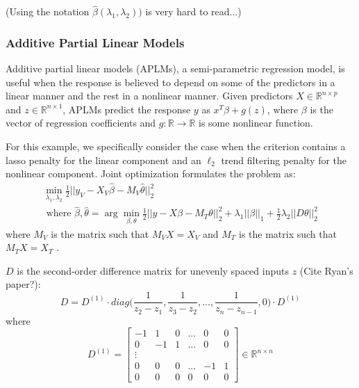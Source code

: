 \documentclass[10pt,letterpaper]{article}
\begin{document}
(Using the notation $\hat \beta(\lambda_1, \lambda_2))$ is very hard to read...)

\subsubsection{Additive Partial Linear Models}

Additive partial linear models (APLMs), a semi-parametric regression model, is useful when the response is believed to depend on some of the predictors in a linear manner and the rest in a nonlinear manner. Given predictors $X \in \mathbb{R}^{n \times p}$ and $z \in \mathbb{R}^{n \times 1}$, APLMs predict the response $y$ as $x^T\beta + g(z)$, where $\beta$ is the vector of regression coefficients and $g: \mathbb{R} \rightarrow \mathbb{R} $ is some nonlinear function.

For this example, we specifically consider the case when the criterion contains a lasso penalty for the linear component and an $\ell_2$ trend filtering penalty for the nonlinear component. Joint optimization formulates the problem as:
\begin{equation}
\begin{array}{c}
\min_{\lambda_1, \lambda_2} \frac{1}{2} \bigl\lvert\bigl\lvert y_V - X_V\hat\beta - M_V \hat\theta \bigl\rvert\bigl\rvert^2_2 \\
\text{ where } \hat\beta, \hat\theta = \arg\min_{\beta, \theta} \frac{1}{2} \bigl\lvert\bigl\lvert y - X\beta - M_T \theta \bigl\rvert\bigl\rvert^2_2
+ \lambda_1 \lvert\lvert \beta \rvert \rvert_1
+ \frac{1}{2} \lambda_2 \lvert\lvert D \theta \rvert \rvert_2^2
\end{array}
\end{equation}
where $M_V$ is the matrix such that $M_V X = X_V$ and $M_T$ is the matrix such that $M_T X = X_T$ .

$D$ is the second-order difference matrix for unevenly spaced inputs $z$ (Cite Ryan's paper?):
\begin{equation}
D = D^{(1)} \cdot diag \big ( \frac{1}{z_{2} - z_1}, \frac{1}{z_{3} - z_2}, ... , \frac{1}{z_{n} - z_{n-1}}, 0 \big ) \cdot D^{(1)}
\end{equation}
where
\begin{equation}
D^{(1)} = 
\begin{bmatrix}
-1 & 1 & 0 & ... & 0 & 0 \\
0 & -1 & 1 & ... & 0 & 0 \\
\vdots \\
0 & 0 & 0 & ... & -1 & 1 \\
0 &0 & 0 &  0  &  0 & 0
\end{bmatrix}
\in
\mathbb{R}^{n\times n}
\end{equation}
\end{document}
